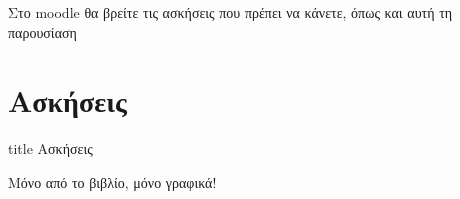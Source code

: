 \documentclass{presentation}
\begin{document}
\begin{frame}[noframenumbering]
  Στο moodle θα βρείτε τις ασκήσεις που πρέπει να κάνετε, όπως και αυτή τη παρουσίαση
\end{frame}

\section{Ασκήσεις}

\begin{frame}[noframenumbering]
  \vfill
  \centering
  \begin{beamercolorbox}[sep=8pt,center,shadow=true,rounded=true]{title}
    Ασκήσεις
  \end{beamercolorbox}
  \vfill
\end{frame}

\begin{askisi}
  Μόνο από το βιβλίο, μόνο γραφικά!
\end{askisi}
\end{document}
